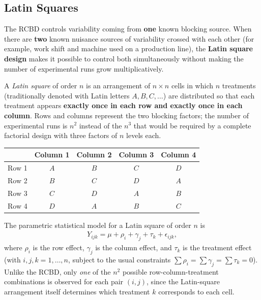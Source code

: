 \subsection{Latin Squares}

The RCBD controls variability coming from \textbf{one} known blocking source. When there are \textbf{two} known nuisance sources of variability crossed with each other (for example, work shift and machine used on a production line), the \textbf{Latin square design} makes it possible to control both simultaneously without making the number of experimental runs grow multiplicatively.

\begin{definicion}
	A \emph{Latin square} of order $n$ is an arrangement of $n \times n$ cells in which $n$ treatments (traditionally denoted with Latin letters $A, B, C, \ldots$) are distributed so that each treatment appears \textbf{exactly once in each row and exactly once in each column}. Rows and columns represent the two blocking factors; the number of experimental runs is $n^2$ instead of the $n^3$ that would be required by a complete factorial design with three factors of $n$ levels each.
\end{definicion}

\begin{center}
	\begin{tabular}{c|cccc}
		 & Column 1 & Column 2 & Column 3 & Column 4 \\ \hline
		Row 1 & $A$ & $B$ & $C$ & $D$ \\
		Row 2 & $B$ & $C$ & $D$ & $A$ \\
		Row 3 & $C$ & $D$ & $A$ & $B$ \\
		Row 4 & $D$ & $A$ & $B$ & $C$ \\
	\end{tabular}
\end{center}

The parametric statistical model for a Latin square of order $n$ is
\begin{align}
	Y_{ijk} = \mu + \rho_i + \gamma_j + \tau_k + \epsilon_{ijk},
	\label{eq:modelo_cuadrado_latino}
\end{align}
where $\rho_i$ is the row effect, $\gamma_j$ is the column effect, and $\tau_k$ is the treatment effect (with $i,j,k = 1,\ldots,n$, subject to the usual constraints $\sum \rho_i = \sum \gamma_j = \sum \tau_k = 0$). Unlike the RCBD, only \emph{one} of the $n^2$ possible row-column-treatment combinations is observed for each pair $(i,j)$, since the Latin-square arrangement itself determines which treatment $k$ corresponds to each cell.

